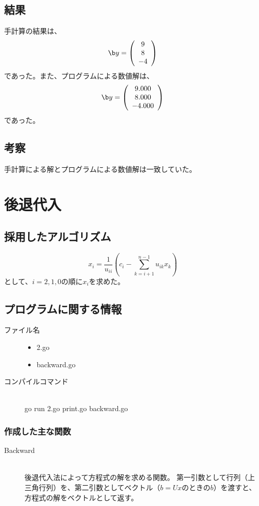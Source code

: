 \documentclass[11pt]{ltjsarticle}
\begin{document}
		\subsection{結果}
			手計算の結果は、
			\[
				{\b y} = \left(
					\begin{array}{c}
						9 \\
						8 \\
						-4
					\end{array}
				\right)
			\]
			であった。また、プログラムによる数値解は、
			\[
				{\b y} = \left(
					\begin{array}{c}
						9.000 \\
						8.000 \\
						-4.000
					\end{array}
				\right)
			\]
			であった。
		\subsection{考察}
			手計算による解とプログラムによる数値解は一致していた。

    \section{後退代入}
    	\subsection{採用したアルゴリズム}
			\[
				x_i = \frac{1}{u_{ii}}\left( c_i - \sum_{k=i+1}^{n-1} u_{ik}x_k \right)
			\]
			として、$i=2,1,0$の順に$x_i$を求めた。

		\subsection{プログラムに関する情報}
			\begin{description}
	        	\item[ファイル名]\mbox{}
					\begin{itemize}
						\item 2.go
						\item backward.go
					\end{itemize}
				\item[コンパイルコマンド] \mbox{}\\
					go run 2.go print.go backward.go
			\end{description}

			\subsubsection*{作成した主な関数}
				\begin{description}
					\item[Backward] \mbox{}\\
						後退代入法によって方程式の解を求める関数。
						第一引数として行列（上三角行列）を、第二引数としてベクトル（$b=Ux$のときの$b$）を渡すと、方程式の解をベクトルとして返す。
				\end{description}
\end{document}
